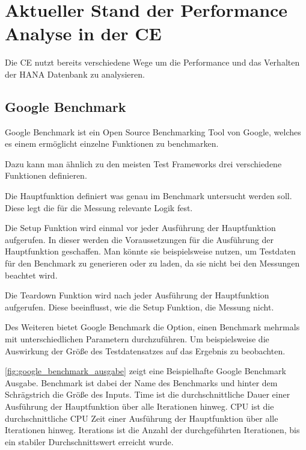 \chapter{Aktueller Stand der Performance Analyse in der \acl{CE}}
Die \ac{CE} nutzt bereits verschiedene Wege um die Performance und das
Verhalten der HANA Datenbank zu analysieren. 
\section{Google Benchmark}
\label{sec:google_benchmark}

Google Benchmark ist ein Open Source Benchmarking Tool von Google,
welches es einem ermöglicht einzelne Funktionen zu benchmarken. 

Dazu kann man ähnlich zu den meisten Test Frameworks drei verschiedene Funktionen definieren.

Die Hauptfunktion definiert was genau im Benchmark untersucht werden
soll. Diese legt die für die Messung relevante Logik fest.

Die Setup Funktion wird einmal vor jeder Ausführung der Hauptfunktion
aufgerufen. In dieser werden die Voraussetzungen für die Ausführung der Hauptfunktion
geschaffen. Man könnte sie beispielsweise nutzen, um Testdaten für den Benchmark
zu generieren oder zu laden, da sie nicht bei den Messungen beachtet wird.

Die Teardown Funktion wird nach jeder Ausführung der Hauptfunktion aufgerufen.
Diese beeinflusst, wie die Setup Funktion, die Messung nicht.

Des Weiteren bietet Google Benchmark die Option, einen Benchmark mehrmals mit
unterschiedlichen Parametern durchzuführen. Um beispielsweise die Auswirkung
der Größe des Testdatensatzes auf das Ergebnis zu beobachten.

\autoref{fig:google_benchmark_ausgabe} zeigt eine Beispielhafte Google
Benchmark Ausgabe. Benchmark ist dabei der Name des Benchmarks und hinter dem
Schrägstrich die Größe des Inputs. Time ist die durchschnittliche Dauer einer
Ausführung der Hauptfunktion über alle Iterationen hinweg. CPU ist die
durchschnittliche CPU Zeit einer Ausführung der Hauptfunktion über alle
Iterationen hinweg. Iterations ist die Anzahl der durchgeführten Iterationen,
bis ein stabiler Durchschnittswert erreicht wurde. \autocite[Vgl.][]{GoogleBenchmark}

